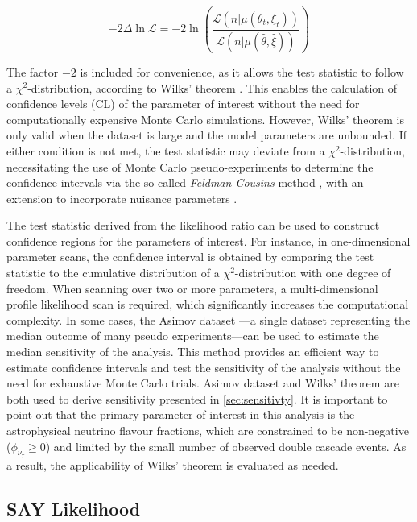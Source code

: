 \begin{equation}\label{eq:llh_ratio_TS}
    -2 \Delta \ln \mathcal{L} = -2 \ln \left( \frac{\mathcal{L}(n|\mu(\theta_t, \xi_t))}{\mathcal{L}(n|\mu(\hat{\theta}, \hat{\xi}))} \right)
\end{equation}

The factor $-2$ is included for convenience, as it allows the test statistic to follow a $\chi^2$-distribution, according to Wilks' theorem . This enables the calculation of confidence levels (CL) of the parameter of interest without the need for computationally expensive Monte Carlo simulations. However, Wilks’ theorem is only valid when the dataset is large and the model parameters are unbounded. If either condition is not met, the test statistic may deviate from a $\chi^2$-distribution, necessitating the use of Monte Carlo pseudo-experiments to determine the confidence intervals via the so-called \emph{Feldman Cousins} method , with an extension to incorporate nuisance parameters .

The test statistic derived from the likelihood ratio can be used to construct confidence regions for the parameters of interest. For instance, in one-dimensional parameter scans, the confidence interval is obtained by comparing the test statistic to the cumulative distribution of a $\chi^2$-distribution with one degree of freedom. When scanning over two or more parameters, a multi-dimensional profile likelihood scan is required, which significantly increases the computational complexity. In some cases, the Asimov dataset \cite{asimov}—a single dataset representing the median outcome of many pseudo experiments—can be used to estimate the median sensitivity of the analysis. This method provides an efficient way to estimate confidence intervals and test the sensitivity of the analysis without the need for exhaustive Monte Carlo trials. Asimov dataset and Wilks' theorem are both used to derive sensitivity presented in \ref{sec:sensitivty}. It is important to point out that the primary parameter of interest in this analysis is the astrophysical neutrino flavour fractions, which are constrained to be non-negative ($\phi_{\nu_\tau} \geq 0$) and limited by the small number of observed double cascade events. As a result, the applicability of Wilks' theorem is evaluated as needed.

\subsection{SAY Likelihood}
\label{sec:SAY}

